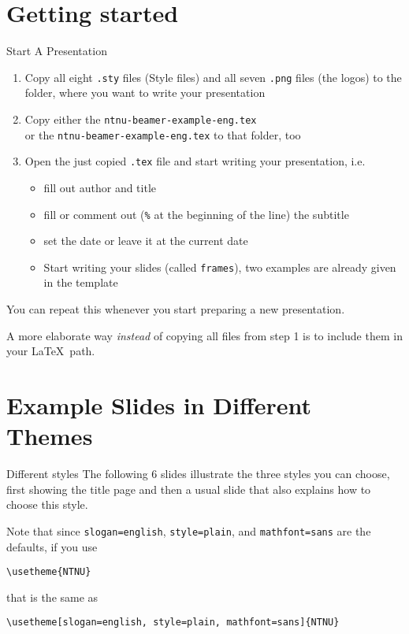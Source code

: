 \documentclass[aspectratio=169]{beamer}
\begin{document}
	\section{Getting started}
		\begin{frame}[fragile]{Start A Presentation}
			\label{slide:start}
			\begin{enumerate}
				\item Copy all eight \lstinline!.sty! files (Style files) and all seven \lstinline!.png! files (the logos) to the folder, where you want to write your presentation
				\item Copy \alert{either} the \lstinline!ntnu-beamer-example-eng.tex!\\
				\alert{or} the \lstinline!ntnu-beamer-example-eng.tex! to that folder, too
				\item Open the just copied \lstinline!.tex! file and start writing your presentation, i.e.
				\begin{itemize}
					\item fill out author and title
					\item fill or comment out (\lstinline!%! at the beginning of the line) the subtitle
					\item set the date or leave it at the current date
					\item Start writing your slides (called \lstinline!frames!), two examples are already given in the template
				\end{itemize}
			\end{enumerate}
			You can repeat this whenever you start preparing a new presentation.

			A more elaborate way \emph{instead} of copying all files from step 1 is to
			include them in your \LaTeX\ path.
		\end{frame}
	\section{Example Slides in Different Themes}
	\begin{frame}[fragile]{Different styles}
		\label{slide:styles-demo}
		The following 6 slides illustrate the three styles you can choose,
		first showing the title page and then a usual slide that also explains how to choose this style.

		Note that since \lstinline!slogan=english!, \lstinline!style=plain!, and \lstinline!mathfont=sans! are the defaults, if you use

		\lstinline!\usetheme{NTNU}!

		that is the same as

		\lstinline!\usetheme[slogan=english, style=plain, mathfont=sans]{NTNU}!
	\end{frame}
	{
		
		
		
	}
\end{document}
